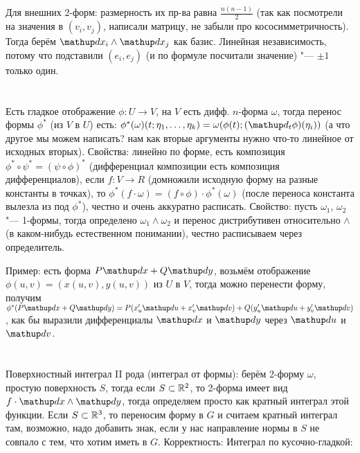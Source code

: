 Для внешних 2-форм: размерность их пр-ва равна $\frac{n(n-1)}{2}$ (так как посмотрели на значения в $(v_i, v_j)$, написали матрицу, не забыли про кососимметричность).
Тогда берём $\d x_i \wedge \d x_j$ как базис.
Линейная независимость, потому что подставили $(e_i, e_j)$ (и по формуле посчитали значение) "--- $\pm 1$ только один.

\section{} %
Есть гладкое отображение $\phi \colon U \to V$, на $V$ есть дифф. $n$-форма $\omega$, тогда перенос формы $\phi^*$ (из $V$ в $U$) есть:
$\phi^*(\omega)(t;\eta_1, \dots, \eta_k)=\omega(\phi(t);(\d_t\phi)(\eta_i))$ (а что другое мы можем написать? нам как вторые аргументы нужно что-то линейное от исходных вторых).
Свойства: линейно по форме, есть композиция $\phi^* \circ \psi^* = (\psi \circ \phi)^*$ (дифференциал композиции есть композиция дифференциалов),
если $f \colon V \to R$ (домножили исходную форму на разные константы в точках), то $\phi^*(f \cdot \omega) = (f \circ \phi) \cdot \phi^*(\omega)$
(после переноса константа вылезла из под $\phi^*$), честно и очень аккуратно расписать.
Свойство: пусть $\omega_1$, $\omega_2$ "--- 1-формы, тогда определено $\omega_1 \wedge \omega_2$ и перенос дистрибутивен относительно $\wedge$ (в каком-нибудь
естественном понимании), честно расписываем через определитель.

Пример: есть форма $P\d x + Q\d y$, возьмём отображение $\phi(u, v) = (x(u, v), y(u, v))$ из $U$ в $V$, тогда можно перенести форму,
получим $\phi^*(P\d x + Q\d y) = P(x_u' \d u + x_v' \d v) + Q(y_u' \d u + y_v' \d v)$, как бы выразили дифференциалы $\d x$ и $\d y$
через $\d u$ и $\d v$.

\section{} %
Поверхностный интеграл II рода (интеграл от формы): берём 2-форму $\omega$, простую поверхность $S$, тогда если
$S \subset \mathbb{R}^2$, то 2-форма имеет вид $f\cdot \d x \wedge \d y$, тогда определяем просто как кратный интеграл этой функции.
Если $S \subset \mathbb{R}^3$, то переносим форму в $G$ и считаем кратный интеграл там, возможно, надо добавить знак, если у нас
направление нормы в $S$ не совпало с тем, что хотим иметь в $G$.
Корректность: \TODO
Интеграл по кусочно-гладкой: \TODO

\section{} %
\TODO

\section{} %
\TODO

\section{} %
\TODO
